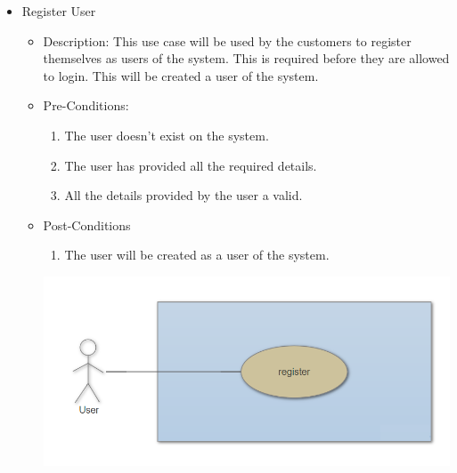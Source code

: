 \documentclass[a4paper,10pt]{article}
\begin{document}
\begin{enumerate}
\begin{itemize}
			\item{Register User}
				\begin{itemize}
					\item Description:
				This use case will be used by the customers to register themselves as users of the system. This is required before they are allowed to login. 
				This will be created a user of the system.

					\item Pre-Conditions:
					\begin{enumerate}
						\item The user doesn't exist on the system.
						\item The user has provided all the required details.
						\item All the details provided by the user a valid. 
					\end{enumerate}
					\item Post-Conditions
					\begin{enumerate}
						\item The user will be created as a user of the system.
					\end{enumerate}
	 \includegraphics[scale=0.62]{Diagrams/RegisterUseCase.png}\\
				\end{itemize}



\end{itemize}
\end{enumerate}
\end{document}
